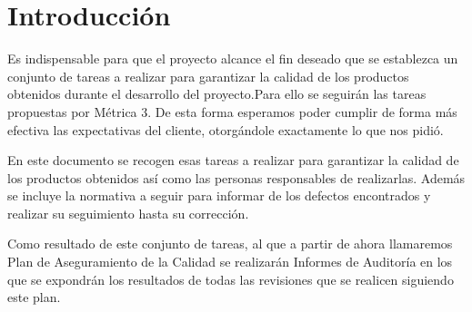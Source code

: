 \section{Introducción}
\par Es indispensable para que el proyecto alcance el fin deseado que se establezca
un conjunto de tareas a realizar para garantizar la calidad de los productos
obtenidos durante el desarrollo del proyecto.Para ello se seguirán las tareas
propuestas por Métrica 3. De esta forma esperamos
poder cumplir de forma más efectiva las expectativas del cliente, otorgándole exactamente
lo que nos pidió.



\par En este documento se recogen esas tareas a realizar para garantizar la calidad de los
productos obtenidos así como las personas responsables de realizarlas. Además se incluye la
normativa a seguir para informar de los defectos encontrados y realizar su seguimiento hasta
su corrección.



\par Como resultado de este conjunto de tareas, al que a partir de ahora llamaremos Plan de
Aseguramiento de la Calidad se realizarán Informes de Auditoría en los que se expondrán los
resultados de todas las revisiones que se realicen siguiendo este plan.
